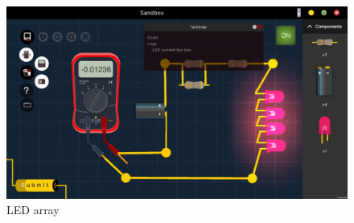 \documentclass[../main.tex]{subfiles}
\begin{document}
\begin{figure}[!ht]
    \centering
    \includegraphics[scale=0.3]{images/chapter5/led_array.jpeg}
    \caption{LED array}
    \label{led_array}
\end{figure}    
\end{document}

